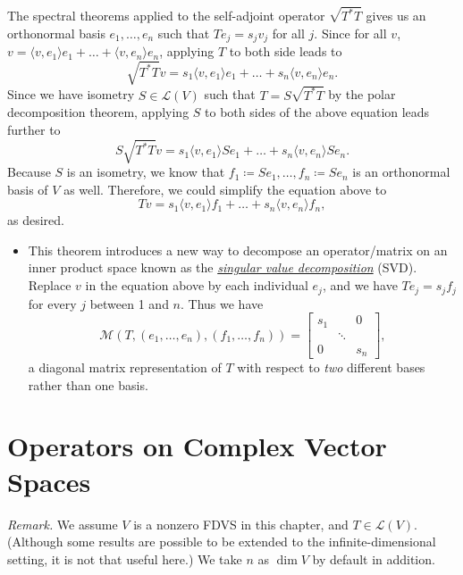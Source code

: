 \documentclass[11pt]{article}
\newcommand{\df}[1]{\ul{\textit{\textsf{#1}}}}
\renewcommand{\d}{\dim}
\newcommand{\inp}[2]{\langle #1, #2 \rangle}
\newcommand{\LV}{\mathcal{L}(V)}
\newcommand{\M}{\mathcal{M}}
\begin{document}
\begin{itemize}
The spectral theorems applied to the self-adjoint operator $\sqrt{T^*T}$ gives us an orthonormal basis $e_1,\dots,e_n$ such that $Te_j = s_j v_j$ for all $j$. Since for all $v$, $v = \inp{v}{e_1}e_1 + \dots + \inp{v}{e_n}e_n$, applying $T$ to both side leads to $$\sqrt{T^*T}v = s_1\inp{v}{e_1}e_1 + \dots + s_n\inp{v}{e_n}e_n.$$ Since we have isometry $S \in \LV$ such that $T = S \sqrt{T^*T}$ by the polar decomposition theorem, applying $S$ to both sides of the above equation leads further to $$S\sqrt{T^*T}v = s_1\inp{v}{e_1}Se_1 + \dots + s_n\inp{v}{e_n}Se_n.$$ Because $S$ is an isometry, we know that $f_1 \coloneqq Se_1,\dots,f_n \coloneqq Se_n$ is an orthonormal basis of $V$ as well. Therefore, we could simplify the equation above to $$Tv = s_1 \inp{v}{e_1}f_1 + \dots + s_n \inp{v}{e_n}f_n,$$ as desired.
\begin{itemize}
	\item This theorem introduces a new way to decompose an operator/matrix on an inner product space known as the \df{singular value decomposition} (SVD). Replace $v$ in the equation above by each individual $e_j$, and we have $Te_j = s_jf_j$ for every $j$ between 1 and $n$. Thus we have
	\begin{equation*}
		\M(T,(e_1,\dots,e_n),(f_1,\dots,f_n)) = \begin{bmatrix}
		s_1 & & 0 \\
		 & \ddots & \\
		 0 & & s_n
		\end{bmatrix},
	\end{equation*}
a diagonal matrix representation of $T$ with respect to \emph{two} different bases rather than one basis.
\end{itemize}
\end{itemize}


\newpage
\section{Operators on Complex Vector Spaces}
\textit{Remark.} We assume $V$ is a nonzero FDVS in this chapter, and $T \in \LV$. (Although some results are possible to be extended to the infinite-dimensional setting, it is not that useful here.) We take $n$ as $\d V$ by default in addition.
\end{document}
